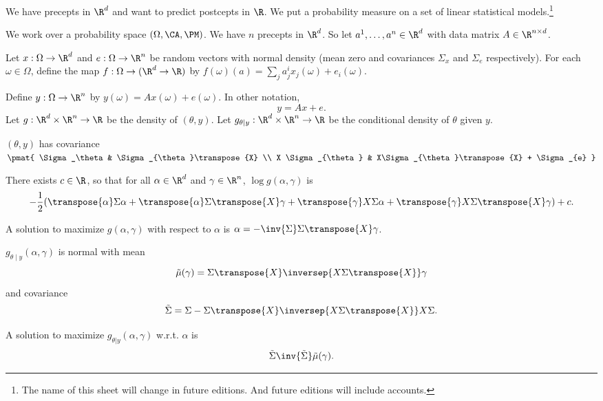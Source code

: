 

We have precepts in $\R^d$ and want to predict postcepts in $\R$.
We put a probability measure on a set of linear statistical models.\footnote{The name of this sheet will change in future editions. And future editions will include accounts.}


We work over a probability space $(\Omega, \CA, \PM)$.
We have $n$ precepts in $\R^d$.
So let $a^1, \dots, a^n \in \R^d$ with data matrix $A \in \R^{n \times d}$.

Let $x: \Omega \to \R^d$ and $e: \Omega \to \R^n$ be random vectors with normal density (mean zero and covariances $\Sigma_{x}$ and $\Sigma_{e}$ respectively).
For each $\omega \in \Omega$, define the map $f: \Omega \to (\R^d \to \R)$ by $f(\omega)(a) = \sum_{j}a^i_jx_j(\omega) + e_i(\omega)$.

Define $y: \Omega \to \R^n$ by
$y(\omega) = Ax(\omega) + e(\omega)$.
In other notation,
\[
  y = Ax + e.
\]
Let $g: \R^{d} \times \R^{n} \to \R$ be the density of $(\theta, y)$.
Let $g_{\theta \mid y}: \R^d \times \R^n \to \R$ be the conditional density of $\theta$ given $y$.

\begin{proposition}
  $(\theta, y)$ has covariance
  $\pmat{
    \Sigma_\theta & \Sigma_{\theta}\transpose{X} \\
      X \Sigma_{\theta} & X\Sigma_{\theta}\transpose{X} + \Sigma_{e}
  }$
\end{proposition}

\begin{proposition}
  There exists $c \in \R$, so that for all $\alpha \in \R^d$ and $\gamma \in \R^n$, $\log g(\alpha,\gamma)$ is
  \[
    -\frac{1}{2}(\transpose{\alpha}\Sigma\alpha + \transpose{\alpha}\Sigma\transpose{X}\gamma + \transpose{\gamma}X\Sigma\alpha + \transpose{\gamma}X\Sigma \transpose{X}\gamma) + c.
  \]
\end{proposition}
\begin{proposition}
  A solution to maximize $g(\alpha, \gamma)$ with respect to $\alpha$ is $\alpha = -\inv{\Sigma}\Sigma\transpose{X}\gamma$.
\end{proposition}
\begin{proposition}
  $g_{\theta \mid y}(\alpha, \gamma)$ is normal with mean
  \[
    \tilde{\mu}(\gamma) = \Sigma \transpose{X}\inversep{X\Sigma\transpose{X}}\gamma
  \] and covariance \[\tilde{\Sigma} = \Sigma - \Sigma\transpose{X}\inversep{X\Sigma\transpose{X}}X\Sigma.\]%
\end{proposition}
\begin{proposition}
  A solution to maximize $g_{\theta | y}(\alpha, \gamma)$ w.r.t. $\alpha$ is
  \[
    \tilde{\Sigma}\inv{\tilde{\Sigma}}\tilde{\mu}(\gamma).
  \]
\end{proposition}


